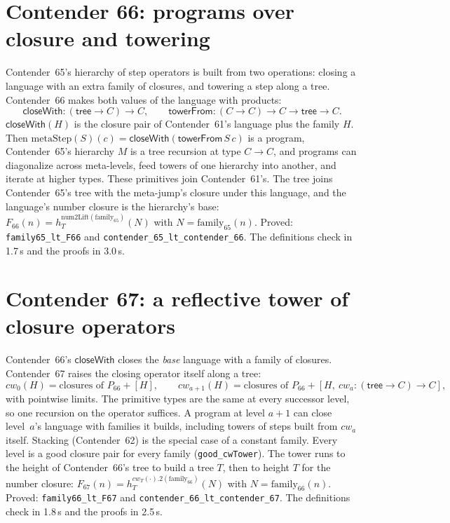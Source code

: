\documentclass[11pt]{article}
\theoremstyle{definition}
\theoremstyle{remark}
\newcommand{\lean}[1]{\texttt{#1}}
\begin{document}
\section{Contender 66: programs over closure and towering}

Contender~65's hierarchy of step operators is built from two operations:
closing a language with an extra family of closures, and towering a step along a
tree. Contender~66 makes both values of the language with products:
\[
\mathsf{closeWith}:(\mathsf{tree}\to C)\to C,\qquad
\mathsf{towerFrom}:(C\to C)\to C\to\mathsf{tree}\to C .
\]
$\mathsf{closeWith}(H)$ is the closure pair of Contender~61's language plus the
family $H$. Then $\mathrm{metaStep}(S)(c)=\mathsf{closeWith}(\mathsf{towerFrom}\,S\,c)$
is a program, Contender~65's hierarchy $M$ is a tree recursion at type
$C\to C$, and programs can diagonalize across meta-levels, feed towers of one
hierarchy into another, and iterate at higher types. These primitives join
Contender~61's. The tree joins Contender~65's tree with the meta-jump's closure
under this language, and the language's number closure is the hierarchy's base:
$F_{66}(n)=h^{\mathrm{num2Lift}(\mathrm{family}_{65})}_T(N)$ with
$N=\mathrm{family}_{65}(n)$. Proved: \lean{family65\_lt\_F66} and
\lean{contender\_65\_lt\_\allowbreak contender\_66}. The definitions check in
1.7\,s and the proofs in 3.0\,s.

\section{Contender 67: a reflective tower of closure operators}

Contender~66's $\mathsf{closeWith}$ closes the \emph{base} language with a
family of closures. Contender~67 raises the closing operator itself along a tree:
\[
cw_0(H)=\text{closures of }P_{66}+[H],\qquad
cw_{a+1}(H)=\text{closures of }P_{66}+[H,\ cw_a:(\mathsf{tree}\to C)\to C],
\]
with pointwise limits. The primitive types are the same at every successor
level, so one recursion on the operator suffices. A program at level $a{+}1$ can
close level~$a$'s language with families it builds, including towers of steps
built from $cw_a$ itself. Stacking (Contender~62) is the special case of a
constant family. Every level is a good closure pair for every family
(\lean{good\_cwTower}). The tower runs to the height of Contender~66's tree to
build a tree $T$, then to height $T$ for the number closure:
$F_{67}(n)=h^{cw_T(\cdot).2(\mathrm{family}_{66})}_T(N)$ with
$N=\mathrm{family}_{66}(n)$. Proved: \lean{family66\_lt\_F67} and
\lean{contender\_66\_lt\_\allowbreak contender\_67}. The definitions check in
1.8\,s and the proofs in 2.5\,s.
\end{document}
